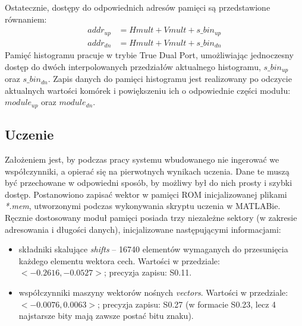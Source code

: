 Ostatecznie, dostępy do odpowiednich adresów pamięci są przedstawione równaniem:
\begin{equation}
\label{eq:adressing_hist}
\left.\begin{aligned} 
addr_{up}&=Hmult+Vmult+s\_bin_{up} \\ 
addr_{dn}&=Hmult+Vmult+s\_bin_{dn}
\end{aligned}\right.
\end{equation}
Pamięć histogramu pracuje w trybie True Dual Port, umożliwiając jednoczesny dostęp do dwóch interpolowanych przedziałów aktualnego histogramu, $s\_bin_{up}$ oraz $s\_bin_{dn}$. 
Zapis danych do pamięci histogramu jest realizowany po odczycie aktualnych wartości komórek i powiększeniu ich o odpowiednie części modułu: $module_{up}$ oraz $module_{dn}$. %



\subsection{Uczenie}
Założeniem jest, by podczas pracy systemu wbudowanego nie ingerować we współczynniki, a opierać się na pierwotnych wynikach uczenia. %
Dane te muszą być przechowane w odpowiedni sposób, by możliwy był do nich prosty i szybki dostęp. 
Postanowiono zapisać wektor w pamięci ROM inicjalizowanej plikami \textit{*.mem}, utworzonymi podczas wykonywania skryptu uczenia w MATLABie.
Ręcznie dostosowany moduł pamięci posiada trzy niezależne sektory (w zakresie adresowania i długości danych), inicjalizowane następującymi informacjami: 

\begin{itemize}
	\item składniki skalujące \textit{shifts} -- 16740 elementów wymaganych do przesunięcia każdego elementu wektora cech. Wartości w przedziale: $<-0.2616, -0.0527>$; precyzja zapisu: S0.11.
	\item współczynniki maszyny wektorów nośnych \textit{vectors}. Wartości w przedziale: $<   -0.0076, 0.0063>$; precyzja zapisu: S0.27 (w formacie S0.23, lecz 4 najstarsze bity mają zawsze postać bitu znaku).
\end{itemize}


